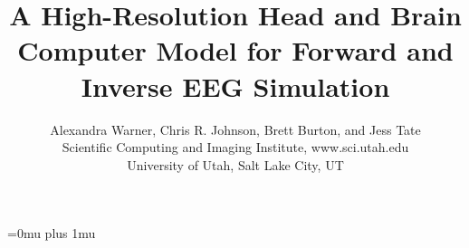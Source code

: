 \documentclass[11pt]{article}
\begin{document}
\title{A High-Resolution Head and Brain Computer Model for Forward and Inverse EEG Simulation}
\author{Alexandra Warner, Chris R. Johnson, Brett Burton, and Jess Tate \\
Scientific Computing and Imaging Institute, www.sci.utah.edu\\
 University of Utah, Salt Lake City, UT\\}
\maketitle







\appendix


\newpage
\Urlmuskip=0mu plus 1mu\relax


\end{document}
